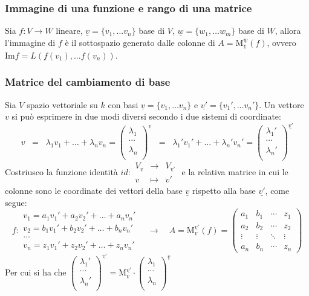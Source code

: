 \documentclass[a4paper]{article}
\newcommand\f[4]{\begin{smallmatrix} {#1} &\to &{#2} \\ {#3} &\mapsto &{#4} \end{smallmatrix}}
\newcommand\m[2]{\text{M}_{\underline{#1}}^{\underline{#2}}}
\newcommand\img{\text{Im}}		%
\begin{document}
\newpage

\subsubsection*{Immagine di una funzione e rango di una matrice}
Sia \(f:V \to W\) lineare, \(\underline{v} = \{v_1, \dots v_n\}\) base di \(V\), \(\underline{w} = \{w_1, \dots w_m\}\) base di \(W\),
allora l'immagine di \(f\) è il sottospazio generato dalle colonne di \(A = \m{v}{w}(f)\), ovvero \(\img f = L(f(v_1), \dots f(v_n))\).

\subsubsection*{Matrice del cambiamento di base}
Sia \(V\) spazio vettoriale su \(k\) con basi \(\underline{v} = \{v_1, \dots v_n\}\) e \(\underline{v'} = \{v_1', \dots v_n'\}\).
Un vettore \(v\) si può esprimere in due modi diversi secondo i due sistemi di coordinate:
\[v \;\; = \;\; \lambda_1 v_1 + \dots + \lambda_n v_n = \begin{pmatrix} \lambda_1 \\ \cdots \\ \lambda_n \\ \end{pmatrix}^{\underline{v}}
	\;\; = \;\;	\lambda_1' v_1' + \dots + \lambda_n' v_n' = \begin{pmatrix} \lambda_1' \\ \cdots \\ \lambda_n' \\ \end{pmatrix}^{\underline{v'}}\]
Costriusco la funzione identità \(id: \f{V_{\underline{v}}}{V_{\underline{v'}}}{v}{v'}\) e la relativa matrice in cui le colonne
sono le coordinate dei vettori della base \(\underline{v}\) rispetto alla base \(\underline{v'}\), come segue:
\[f: \begin{matrix}
	v_1 = a_1 v_1' + a_2 v_2' + \dots + a_n v_n' \\
	v_2 = b_1 v_1' + b_2 v_2' + \dots + b_n v_n' \\
	\dots \\
	v_n = z_1 v_1' + z_2 v_2' + \dots + z_n v_n'
\end{matrix} \quad \longrightarrow \quad A = \m{v}{v'}(f) = \left( \begin{matrix}
	a_1 & b_1 & \cdots & z_1 \\
	a_2 & b_2 & \cdots & z_2 \\
	\vdots & \vdots & \ddots & \vdots \\
	a_n & b_n & \cdots & z_n
\end{matrix} \right)\]
Per cui si ha che \(\begin{pmatrix} \lambda_1' \\ \cdots \\ \lambda_n' \\ \end{pmatrix}^{\underline{v'}} = \m{v}{v'} \cdot \begin{pmatrix} \lambda_1 \\ \cdots \\ \lambda_n \\ \end{pmatrix}^{\underline{v}}\)
\end{document}
